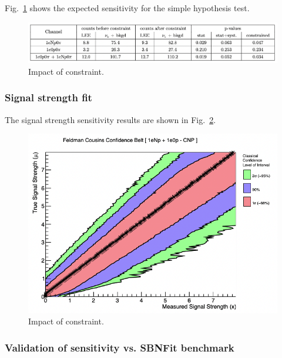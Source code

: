 Fig.~\ref{fig:simplehypothesisresults} shows the expected sensitivity for the simple hypothesis test.

\begin{center}
\begin{figure}[h]
    \includegraphics[width=1.00\textwidth]{technote/SystematicsSensitivity/Figures/simplehypothesisresults.png}
    \caption{Impact of constraint.}
    \label{fig:simplehypothesisresults} 
\end{figure}
\end{center}

\newpage
\subsubsection{Signal strength fit}

The signal strength sensitivity results are shown in Fig.~\ref{fig:signalstrengthsensitivity}.
\begin{center}
\begin{figure}[h]
    \includegraphics[width=1.00\textwidth]{technote/SystematicsSensitivity/Figures/signalstrengthsensitivity.png}
    \caption{Impact of constraint.}
    \label{fig:signalstrengthsensitivity} 
\end{figure}
\end{center}

\newpage
\subsubsection{Validation of sensitivity vs. SBNFit benchmark}
